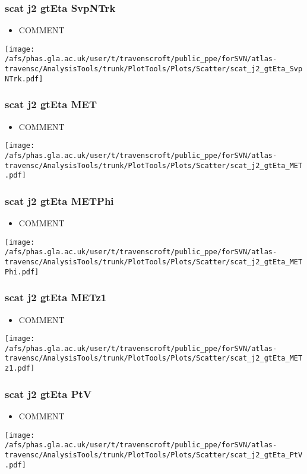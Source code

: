 \documentclass{beamer}
\begin{document}
\begin{frame}
\frametitle{scat j2 gtEta SvpNTrk}
\begin{itemize}
\item COMMENT
\end{itemize}
\begin{center}
\texttt{[image: /afs/phas.gla.ac.uk/user/t/travenscroft/public\_ppe/forSVN/atlas-travensc/AnalysisTools/trunk/PlotTools/Plots/Scatter/scat\_j2\_gtEta\_SvpNTrk.pdf]}
\end{center}
\end{frame}

\begin{frame}
\frametitle{scat j2 gtEta MET}
\begin{itemize}
\item COMMENT
\end{itemize}
\begin{center}
\texttt{[image: /afs/phas.gla.ac.uk/user/t/travenscroft/public\_ppe/forSVN/atlas-travensc/AnalysisTools/trunk/PlotTools/Plots/Scatter/scat\_j2\_gtEta\_MET.pdf]}
\end{center}
\end{frame}

\begin{frame}
\frametitle{scat j2 gtEta METPhi}
\begin{itemize}
\item COMMENT
\end{itemize}
\begin{center}
\texttt{[image: /afs/phas.gla.ac.uk/user/t/travenscroft/public\_ppe/forSVN/atlas-travensc/AnalysisTools/trunk/PlotTools/Plots/Scatter/scat\_j2\_gtEta\_METPhi.pdf]}
\end{center}
\end{frame}

\begin{frame}
\frametitle{scat j2 gtEta METz1}
\begin{itemize}
\item COMMENT
\end{itemize}
\begin{center}
\texttt{[image: /afs/phas.gla.ac.uk/user/t/travenscroft/public\_ppe/forSVN/atlas-travensc/AnalysisTools/trunk/PlotTools/Plots/Scatter/scat\_j2\_gtEta\_METz1.pdf]}
\end{center}
\end{frame}

\begin{frame}
\frametitle{scat j2 gtEta PtV}
\begin{itemize}
\item COMMENT
\end{itemize}
\begin{center}
\texttt{[image: /afs/phas.gla.ac.uk/user/t/travenscroft/public\_ppe/forSVN/atlas-travensc/AnalysisTools/trunk/PlotTools/Plots/Scatter/scat\_j2\_gtEta\_PtV.pdf]}
\end{center}
\end{frame}
\end{document}
